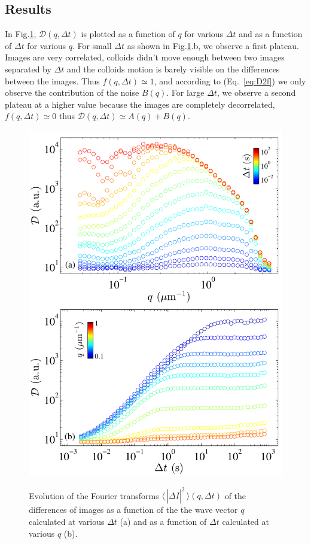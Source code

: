 \documentclass[%
 aip,
 jmp,%
 amsmath,amssymb,
reprint,%
]{revtex4-1}
\begin{document}
\subsection{Results}

In Fig.\ref{D}, $\mathcal{D}(q, \Delta t)$ is plotted as a function of $q$ for various $\Delta t$ and as a function of $\Delta t$ for various $q$. For small $\Delta t$  as shown in Fig.\ref{D}.b, we observe a first plateau. Images are very correlated, colloids didn't move enough between two images separated by $\Delta t$ and the colloids motion is barely visible on the differences between the images. Thus $f(q, \Delta t) \simeq 1$, and according to (Eq.~\ref{eq:D2f}) we only observe the contribution of the noise $B(q)$. For large $\Delta t$, we observe a second plateau at a higher value because the images are completely decorrelated, $f(q, \Delta t) \simeq 0$ thus $\mathcal{D}(q, \Delta t) \simeq A(q)+B(q)$.

\begin{figure}
	\includegraphics[width=\linewidth]{D_fonction_q_et_Deltat.pdf}\\
	\caption{Evolution of the Fourier transforms $\langle \, |\widehat{\Delta I}|^2 \, \rangle (q, \Delta t)$ of the differences of images as a function of the the wave vector $q$ calculated at various $\Delta t$ (a) and as a function of $\Delta t$ calculated at various $q$ (b).}
	\label{D}
\end{figure}
\end{document}
